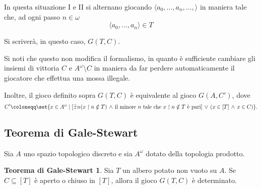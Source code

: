 \documentclass[titlepage]{article}
\newcommand{\1}{\mathds{1}}
\theoremstyle{definition}%
\newtheorem{GaleStewart}[thm]{Teorema di Gale-Stewart}
\theoremstyle{plain}
\theoremstyle{remark}
\newcommand{\missingreference}[1]{\textcolor{red}{#1}}
\begin{document}
In questa situazione I e II si alternano giocando \(\langle a_{0},\dots,a_{n},\dots,\rangle\) in maniera tale che, ad ogni passo \(n \in \omega\)
\begin{equation*}
\langle a_{0},\dots,a_{n}\rangle \in T
\end{equation*}

Si scriverà, in questo caso, \(G(T, C)\).

Si noti che questo non modifica il formalismo, in quanto è sufficiente cambiare gli insiemi di vittoria \(C\) e \(A^{\omega}\setminus C\) in maniera da far perdere automaticamente il giocatore che effettua una mossa illegale.

Inoltre, il gioco definito sopra \(G(T,C)\) è {equivalente} al gioco \(G(A, C')\), dove
\begin{equation*}
C' \coloneqq \set{x \in A^{\omega}\mid \left[\exists\, n (x\upharpoonright n \notin T) \,\land\, \text{il minore }n\text{ tale che }x\upharpoonright n \notin T\text{ è pari}\right] \,\lor\, (x \in [T] \,\land\, x \in C)}.
\end{equation*}

\subsection{Teorema di Gale-Stewart}

Sia \(A\) uno {spazio topologico} {discreto} e sia \(A^{\omega}\) dotato della {topologia prodotto}.

\begin{GaleStewart}\label{sec:orgf56b48c}
Sia \(T\) un {albero} {potato} non vuoto su \(A\). Se \(C \subseteq [T]\) è {aperto} o {chiuso} in \([T]\), allora {il gioco} \(G(T,C)\) è {determinato}.
\end{GaleStewart}



\end{document}
